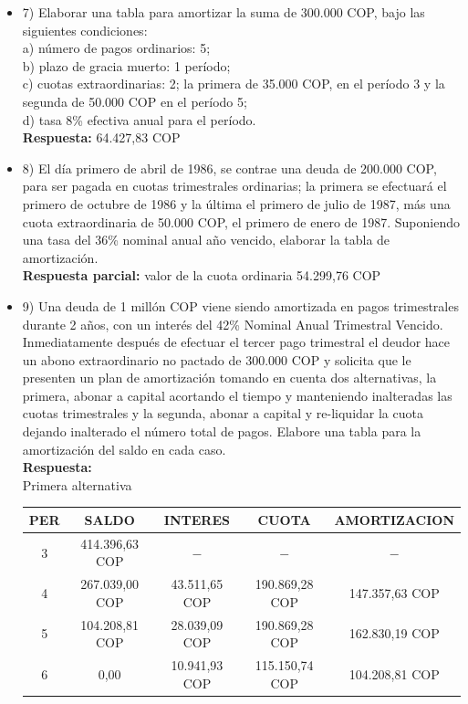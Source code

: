 \begin{itemize}
 \item 7)	Elaborar una tabla para amortizar la suma de 300.000 COP, bajo las siguientes condiciones:\\

       a)	número de pagos ordinarios: 5;\\
       b)	plazo de gracia muerto: 1 período;\\
       c)	cuotas extraordinarias: 2; la primera de 35.000 COP, en el período 3 y la segunda de 50.000 COP en el período 5;\\
       d)	tasa 8\% efectiva anual para el período.\\
       \textbf{Respuesta:} 64.427,83 COP
       \medskip

 \item 8)	El día primero de abril de 1986, se contrae una deuda de 200.000 COP, para ser pagada en cuotas trimestrales ordinarias; la primera se efectuará el primero de octubre de 1986 y la última el primero de julio de 1987, más una cuota extraordinaria de 50.000 COP, el primero de enero de 1987. Suponiendo una tasa del 36\%  nominal anual año vencido, elaborar la tabla de amortización.\\
       \textbf{Respuesta parcial:} valor de la cuota ordinaria 54.299,76 COP
       \medskip

 \item 9)	Una deuda de 1 millón COP viene siendo amortizada en pagos trimestrales durante 2 años, con un interés del 42\%  Nominal Anual Trimestral Vencido. Inmediatamente después de efectuar el tercer pago trimestral el deudor hace un abono extraordinario no pactado de 300.000 COP y solicita que le presenten un plan de amortización tomando en cuenta dos alternativas, la primera, abonar a capital acortando el tiempo y manteniendo inalteradas las cuotas trimestrales y la segunda, abonar a capital y re-liquidar la cuota dejando inalterado el número total de pagos. Elabore una tabla para la amortización del saldo en cada caso.\\
       \textbf{Respuesta:}\\
       Primera alternativa
       \begin{center}
     \begin{tabular}{| c | c | c | c | c |}
    \hline
    \textbf{PER} & \textbf{SALDO} & \textbf{INTERES} & \textbf{CUOTA} & \textbf{AMORTIZACION}  \\ \hline
    3 & 414.396,63 COP & $-$ & $-$ &  $-$  \\ \hline
    4 & 267.039,00 COP & 43.511,65 COP & 190.869,28 COP &  147.357,63 COP \\ \hline
    5 & 104.208,81 COP & 28.039,09 COP & 190.869,28 COP & 162.830,19 COP \\ \hline
    6 & 0,00 & 10.941,93 COP & 115.150,74 COP & 104.208,81 COP \\ \hline
    \end{tabular}\\
 \end{center}


\end{itemize}
